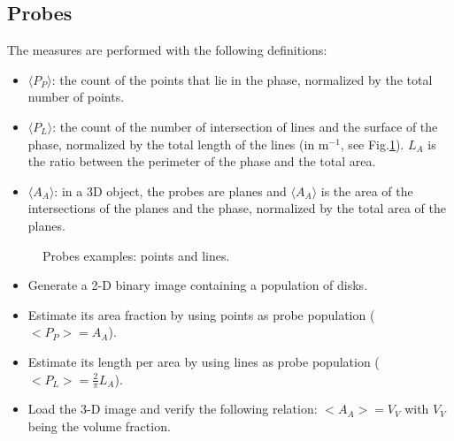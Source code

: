 \subsection{Probes}
 The measures are performed with the following definitions:
\begin{itemize}
 \item $\langle P_P\rangle$: the count of the points that lie in the phase, normalized by the total number of points.
 \item $\langle P_L\rangle$: the count of the number of intersection of lines and the surface of the phase, normalized by the total length of the lines (in m$^{-1}$, see Fig.\ref{fig:stereology:enonce:PL}). $L_A$ is the ratio between the perimeter of the phase and the total area.
 \item $\langle A_A\rangle$: in a 3D object, the probes are planes and $\langle A_A\rangle$ is the area of the intersections of the planes and the phase, normalized by the total area of the planes.
\end{itemize}
 
\begin{figure}[htbp]
 \centering\caption{Probes examples: points and lines.}%
 \hfill
 \label{fig:stereology:enonce:PL}%
\end{figure}


\begin{qbox}
\begin{itemize}
	\item Generate a 2-D binary image containing a population of disks. 
	\item Estimate its area fraction by using points as probe population ($<P_P>=A_A$).
	\item Estimate its length per area by using lines as probe population ($<P_L>=\frac{2}{\pi}L_A$).
	\item Load the 3-D image and verify the following relation: $<A_A>=V_V$ with $V_V$ being the volume fraction.
	\end{itemize}
\end{qbox}



